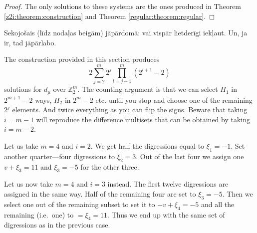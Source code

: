 \begin{proof}
    The only solutions to these systems are the ones produced in Theorem \ref{z2i:theorem:construction} and Theorem \ref{regular:theorem:regular}.
\end{proof}


Sekojošais (līdz nodaļas beigām) jāpārdomā: vai vispār lietderīgi iekļaut. Un, ja ir, tad jāpārlabo.

The construction provided in this section produces
\begin{equation}
    2 \sum\limits_{j=2}^m 2^j \prod\limits_{l=j+1}^m (2^{l+1}-2)
\end{equation}
solutions for $d_\mu$ over $\mathbb Z_2^m$. The counting argument is that we can select $H_1$ in $2^{m+1}-2$ ways, $H_2$ in $2^m-2$ etc. until you stop and choose one of the remaining $2^j$ elements. And twice everything as you can flip the signs. Beware that taking $i=m-1$ will reproduce the difference multisets that can be obtained by taking $i=m-2$.

\begin{example}
    Let us take $m=4$ and $i=2$. We get half the digressions equal to $\xi_1=-1$. Set another quarter---four digressions to $\xi_2=3$. Out of the last four we assign one $v+\xi_3=11$ and $\xi_3=-5$ for the other three.
    
    Let us now take $m=4$ and $i=3$ instead. The first twelve digressions are assigned in the same way. Half of the remaining four are set to $\xi_3=-5$. Then we select one out of the remaining subset to set it to $-v+\xi_4=-5$ and all the remaining (i.e.\ one) to $=\xi_4=11$. Thus we end up with the same set of digressions as in the previous case.
\end{example}

